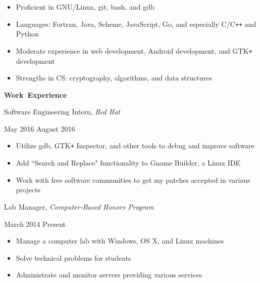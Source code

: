 \documentclass[11pt]{article}
\begin{document}
\begin{itemize}
  \item Proficient in GNU/Linux, git, bash, and gdb
  \item Languages: Fortran, Java, Scheme, JavaScript, Go, and especially C/C\texttt{++} and Python
  \item Moderate experience in web development, Android development, and GTK\texttt{+} development
  \item Strengths in CS: cryptography, algorithms, and data structures
\end{itemize}

\vspace{0.8em}
\hbox{\large \textbf{Work Experience}}

\begin{minipage}[t]{0.7\textwidth}
\flushleft
Software Engineering Intern, \textit{Red Hat}\\
\end{minipage}
\begin{minipage}[t]{0.25\textwidth}
\flushright
May 2016 \space \textemdash \space August 2016\\
\end{minipage}

\begin{itemize}
  \item Utilize gdb, GTK\texttt{+} Inspector, and other tools to debug and improve software
  \item Add ``Search and Replace" functionality to Gnome Builder, a Linux IDE
  \item Work with free software communities to get my patches accepted in various projects
\end{itemize}

\begin{minipage}[t]{0.7\textwidth}
\flushleft
Lab Manager, \textit{Computer-Based Honors Program}\\
\end{minipage}
\begin{minipage}[t]{0.25\textwidth}
\flushright
March 2014 \space \textemdash \space Present\\
\end{minipage}

\begin{itemize}
  \item Manage a computer lab with Windows, OS X, and Linux machines
  \item Solve technical problems for students
  \item Administrate and monitor servers providing various services
\end{itemize}
\end{document}
